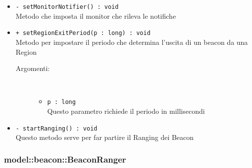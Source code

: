 \documentclass[../DefinizioneDiProdotto.tex]{subfiles}
\begin{document}
\begin{description}
\begin{itemize}
\begin{description}
\end{description}
\item \texttt{- setMonitorNotifier() : void}\\
Metodo che imposta il monitor che rileva le notifiche
 \item \texttt{+ setRegionExitPeriod(p : long) : void}\\
Metodo per impostare il periodo che determina l'uscita di un beacon da una Region
 \begin{description}
\item[Argomenti:] \
\begin{itemize}
\item \texttt{p : long}\\
Questo parametro richiede il periodo in millisecondi \end{itemize}
\end{description}
\item \texttt{- startRanging() : void}\\
Questo metodo serve per far partire il Ranging dei Beacon 
 \end{itemize}
\end{description}

\subsubsection{model::beacon::BeaconRanger}
\end{document}
